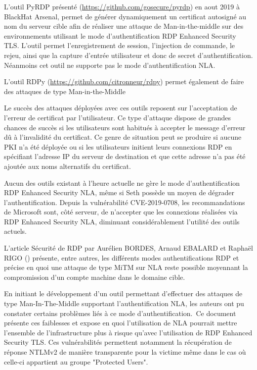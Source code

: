 L'outil PyRDP pr\'esenté (\url{https://github.com/gosecure/pyrdp}) en aout 2019 à BlackHat Arsenal, permet de générer dynamiquement un certificat autosigné au nom du serveur cible afin de réaliser une attaque de Man-in-the-middle sur des environnements utilisant le mode d'authentification RDP Enhanced Security TLS. L'outil permet l'enregistrement de session, l'injection de commande, le rejeu, ainsi que la capture d'entrée utilisateur et donc de secret d'authentification. Néanmoins cet outil ne supporte pas le mode d'authentification NLA.

L'outil RDPy (\url{https://github.com/citronneur/rdpy}) permet également de faire des attaques de type Man-in-the-Middle

Le succès des attaques d\'eployées avec ces outils reposent sur l'acceptation de l'erreur de certificat par l'utilisateur. Ce type d'attaque dispose de grandes chances de succès si les utilisateurs sont habitués à accepter le message d'erreur dû à l'invalidité du certificat. Ce genre de situation peut se produire si aucune PKI n'a été déployée ou si les utilisateurs initient leurs connexions RDP en spécifiant l'adresse IP du serveur de destination et que cette adresse n'a pas été ajoutée aux noms alternatifs du certificat.

Aucun des outils existant à l’heure actuelle ne gère le mode d’authentification RDP Enhanced Security NLA, même si Seth possède un moyen de d\'egrader l’authentification. Depuis la vulnérabilité CVE-2019-0708, les recommandations de Microsoft sont, côté serveur, de n’accepter que les connexions réalisées via RDP Enhanced Security NLA, diminuant considérablement l'utilité des outils actuels.

L'article S\'ecurité de RDP par Aurélien BORDES, Arnaud EBALARD et Raphaël RIGO (\cite{SecuriteRDP}) présente, entre autres, les différents modes authentifications RDP et précise en quoi une attaque de type MiTM sur NLA reste possible moyennant la compromission d'un compte machine dans le domaine cible. 

En initiant le d\'eveloppement d’un outil permettant d’effectuer des attaques de type Man-In-The-Middle supportant l’authentification NLA, les auteurs ont pu constater certains problèmes liés à ce mode d’authentification. Ce document présente ces faiblesses et expose en quoi l’utilisation de NLA pourrait mettre l’ensemble de l’infrastructure plus à risque qu’avec l’utilisation de RDP Enhanced Security TLS.
Ces vuln\'erabilités permettent notamment la récupération de réponse NTLMv2 de manière transparente pour la victime même dans le cas où celle-ci appartient au groupe "Protected Users".

